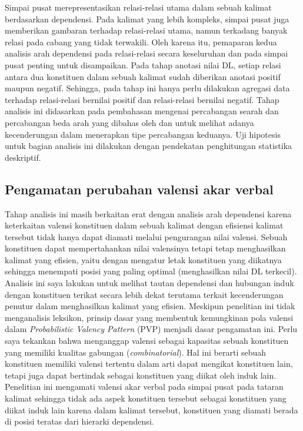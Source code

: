 Simpai pusat merepresentasikan relasi-relasi utama dalam sebuah kalimat berdasarkan dependensi. Pada kalimat yang lebih kompleks, simpai pusat juga memberikan gambaran terhadap relasi-relasi utama, namun terkadang banyak relasi pada cabang yang tidak terwakili. Oleh karena itu, pemaparan kedua analisis arah dependensi pada relasi-relasi secara keseluruhan dan pada simpai pusat penting untuk disampaikan. Pada tahap anotasi nilai DL, setiap relasi antara dua konstituen dalam sebuah kalimat sudah diberikan anotasi positif maupun negatif. Sehingga, pada tahap ini hanya perlu dilakukan agregasi data terhadap relasi-relasi bernilai positif dan relasi-relasi bernilai negatif. Tahap analisis ini didasarkan pada pembahasan mengenai percabangan searah dan percabangan beda arah yang dibahas oleh \cite{temperley2008dependency} dan \cite{dryer1992greenbergian} untuk melihat adanya kecenderungan dalam menerapkan tipe percabangan keduanya. Uji hipotesis untuk bagian analisis ini dilakukan dengan pendekatan penghitungan statistika deskriptif.

\subsection{Pengamatan perubahan valensi akar verbal}
Tahap analisis ini masih berkaitan erat dengan analisis arah dependensi karena keterkaitan valensi konstituen dalam sebuah kalimat dengan efisiensi kalimat tersebut tidak hanya dapat diamati melalui pengurangan nilai valensi. Sebuah konstituen dapat mempertahankan nilai valensinya tetapi tetap menghasilkan kalimat yang efisien, yaitu dengan mengatur letak konstituen yang diikatnya sehingga menempati posisi yang paling optimal (menghasilkan nilai DL terkecil). Analisis ini saya lakukan untuk melihat tautan dependensi dan hubungan induk dengan konstituen terikat secara lebih dekat terutama terkait kecenderungan penutur dalam menghasilkan kalimat yang efisien. Meskipun penelitian ini tidak menganalisis leksikon, prinsip dasar yang membentuk kemungkinan pola valensi dalam \textit{Probabilistic Valency Pattern} (PVP) \citep{liu2006syntactic} menjadi dasar pengamatan ini. Perlu saya tekankan bahwa \cite{liu2006syntactic} menganggap valensi sebagai kapasitas sebuah konstituen yang memiliki kualitas gabungan (\textit{combinatorial}). Hal ini berarti sebuah konstituen memiliki valensi tertentu dalam arti dapat mengikat konstituen lain, tetapi juga dapat bertindak sebagai konstituen yang diikat oleh induk lain. Penelitian ini mengamati valensi akar verbal pada simpai pusat pada tataran kalimat sehingga tidak ada aspek konstituen tersebut sebagai konstituen yang diikat induk lain karena dalam kalimat tersebut, konstituen yang diamati berada di posisi teratas dari hierarki dependensi.

